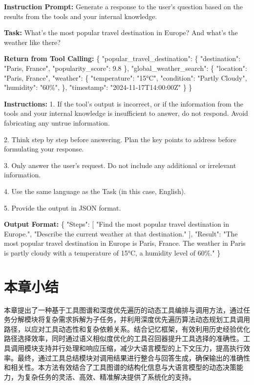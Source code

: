 \begin{center}
\begin{tcolorbox}[colback=bgcolor, colframe=black, width=0.85\textwidth, boxrule=0.5mm, 
coltitle=white, colbacktitle=titlecolor, title=An Example for Response Generation with GPT-4]


\textbf{Instruction Prompt:} Generate a response to the user's question based on the results from the tools and your internal knowledge.

\textbf{Task:} What's the most popular travel destination in Europe? And what's the weather like there?

\textbf{Return from Tool Calling:} 
\{%
    "popular\_travel\_destination": \{%
        "destination": "Paris, France",%
        "popularity\_score": 9.8%
    \},%
    "global\_weather\_search": \{%
        "location": "Paris, France",%
        "weather": \{%
            "temperature": "15°C",%
            "condition": "Partly Cloudy",%
            "humidity": "60\%",%
        \},%
        "timestamp": "2024-11-17T14:00:00Z"%
    \}%
\}

\textbf{Instructions:}
1. If the tool's output is incorrect, or if the information from the tools and your internal knowledge is insufficient to answer, do not respond. Avoid fabricating any untrue information.

2. Think step by step before answering. Plan the key points to address before formulating your response.

3. Only answer the user's request. Do not include any additional or irrelevant information.

4. Use the same language as the Task (in this case, English).

5. Provide the output in JSON format.

\textbf{Output Format:}  
\{%
    "Steps": [%
        "Find the most popular travel destination in Europe.",%
        "Describe the current weather at that destination."%
    ],%
    "Result": "The most popular travel destination in Europe is Paris, France. The weather in Paris is partly cloudy with a temperature of 15°C, a humidity level of 60\%."%
\}

\end{tcolorbox}
\end{center}

\section{本章小结}
\label{sec:summary_chap4}

本章提出了一种基于工具图谱和深度优先遍历的动态工具编排与调用方法，通过任务分解模块将复杂需求拆解为子任务，并利用深度优先遍历算法动态规划工具调用路径，以应对工具动态性和复杂依赖关系。结合记忆框架，有效利用历史经验优化路径选择效率，同时通过语义相似度优化的工具召回器提升工具选择的准确性。工具调用模块支持并行处理和响应压缩，减少大语言模型的上下文压力，提高执行效率。最终，通过工具总结模块对调用结果进行整合与回答生成，确保输出的准确性和相关性。本方法有效结合了工具图谱的结构化信息与大语言模型的动态决策能力，为复杂任务的灵活、高效、精准解决提供了系统化的支持。